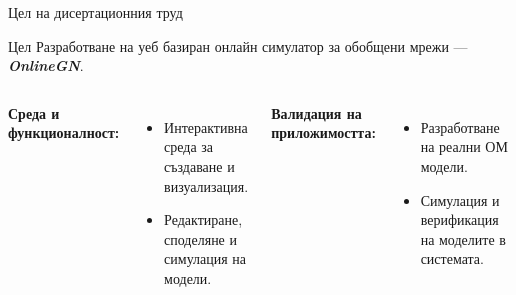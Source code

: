 \documentclass[aspectratio=169]{beamer}
\begin{document}
\begin{frame}{Цел на дисертационния труд}
  
  \begin{block}{Цел}
    \centering \vspace{0.2cm} \large
    Разработване на уеб базиран онлайн симулатор за обобщени мрежи --- \textbf{\textit{OnlineGN}}.
    \vspace{0.2cm}
  \end{block}

  \vspace{0.4cm}

  \begin{columns}[t]
    \textbf{\color{mainblue}Среда и функционалност:}
    \begin{itemize}
      \item Интерактивна среда за създаване и визуализация.
      \item Редактиране, споделяне и симулация на модели.
    \end{itemize}

    \textbf{\color{mainblue}Валидация на приложимостта:}
    \begin{itemize}
      \item Разработване на реални ОМ модели.
      \item Симулация и верификация на моделите в системата.
    \end{itemize}
  \end{columns}
\end{frame}
\end{document}

